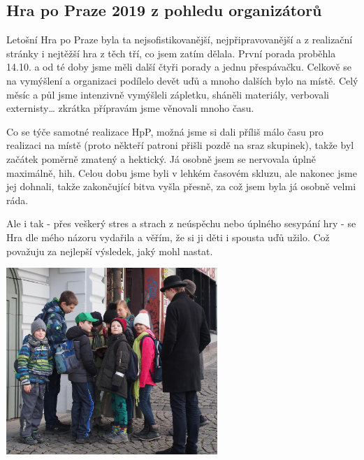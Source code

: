\subsection*{Hra po Praze 2019 z pohledu organizátorů}
\label{sub:hra_po_praze_2019_z_pohledu_organizátorů}

Letošní Hra po Praze byla ta nejsofistikovanější, nejpřipravovanější a z realizační stránky i nejtěžší hra z těch tří, co jsem zatím dělala. První porada proběhla 14.10. a od té doby jsme měli další čtyři porady a jednu přespávačku. Celkově se na vymýšlení a organizaci podílelo devět uďů a mnoho dalších bylo na místě. Celý měsíc a půl jsme intenzivně vymýšleli zápletku, sháněli materiály, verbovali externisty… zkrátka přípravám jsme věnovali mnoho času.

Co se týče samotné realizace HpP, možná jsme si dali příliš málo času pro realizaci na místě (proto někteří patroni přišli pozdě na sraz skupinek), takže byl začátek poměrně zmatený a hektický. Já osobně jsem se nervovala úplně maximálně, hih. Celou dobu jsme byli v lehkém časovém skluzu, ale nakonec jsme jej dohnali, takže zakončující bitva vyšla přesně, za což jsem byla já osobně velmi ráda. 

Ale i tak - přes veškerý stres a strach z neúspěchu nebo úplného sesypání hry - se Hra dle mého názoru vydařila a věřím, že si ji děti i spousta uďů užilo. Což považuju za nejlepší výsledek, jaký mohl nastat.


\begin{center}

\includegraphics[width=8cm]{img/udo_clanky/hrapopraze.JPG}

\end{center}
\clearpage